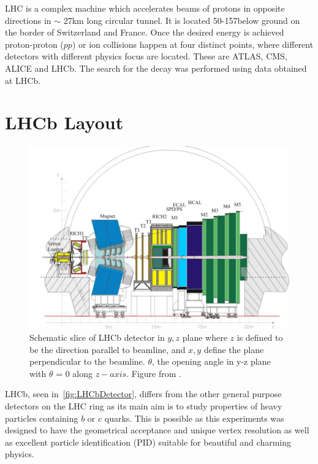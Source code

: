 \Gls{LHC} is a complex machine which accelerates beams of protons in opposite directions in $\sim$ 27km long circular tunnel. It is located
50-157\m below ground on the border of Switzerland and France. Once the desired energy is achieved proton-proton ($pp$) or ion collisions happen at four distinct points, where different detectors with different physics focus are located. These are \Gls{ATLAS}, \Gls{CMS}, \Gls{ALICE} and \Gls{LHCb}. 
The search for the decay \Bmumumu was performed using data obtained at \Gls{LHCb}. 

\section{LHCb Layout }

\begin{figure}
	\centering
	\includegraphics[scale = 0.25]{figs/detector/lhcbdet.pdf}
	\caption{Schematic slice of \Gls{LHCb} detector in $y,z$ plane where $z$ is defined to be the direction parallel to beamline, and $x,y$ define the plane perpendicular to the beamline. $\theta$, the opening angle in y-z plane with $\theta$ = 0 along $z-axis$. Figure from \cite{LHCbdetector}.}
	\label{fig:LHCbDetector}
\end{figure}


\Gls{LHCb}, seen in~\autoref{fig:LHCbDetector}, differs from the other general purpose detectors on the \Gls{LHC} ring as its main aim is to study properties of heavy particles containing $b$ or $c$ quarks. This is possible as this experiments was designed to have the geometrical acceptance and unique vertex resolution as well as excellent particle identification (\Gls{PID}) suitable for beautiful and charming physics.

